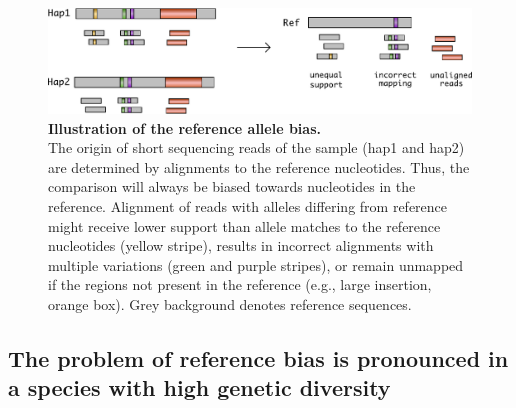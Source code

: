 \documentclass[../main.tex]{subfiles}
\begin{document}
\bigskip

\begin{figure}[!htb]
    \centering
    \includegraphics[width=\textwidth]{intro/fig2.pdf}
        \vspace{3mm}
        \caption[Illustration of the reference allele bias]{\textbf{Illustration of the reference allele bias.} \\
        \footnotesize{The origin of short sequencing reads of the sample (hap1 and hap2) are determined by alignments to the reference nucleotides. Thus, the comparison will always be biased towards nucleotides in the reference. Alignment of reads with alleles differing from reference might receive lower support than allele matches to the reference nucleotides (yellow stripe), results in incorrect alignments with multiple variations (green and purple stripes), or remain unmapped if the regions not present in the reference (e.g., large insertion, orange box). Grey background denotes reference sequences.}}
        \label{fig12:bias}
\end{figure}

\subsection*{The problem of reference bias is pronounced in a species with high genetic diversity}
\end{document}
